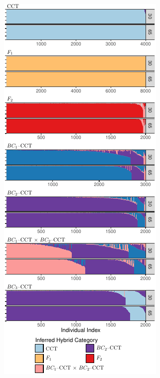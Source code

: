 {\begin{figure}
{\includegraphics[width=0.98\columnwidth]{figures/newhybs-texed-crop.pdf}
}
\caption[\nhbpcap]{\nhbpcap}
\label{fig:newhyb-sims-barplot}
\end{figure}


}
